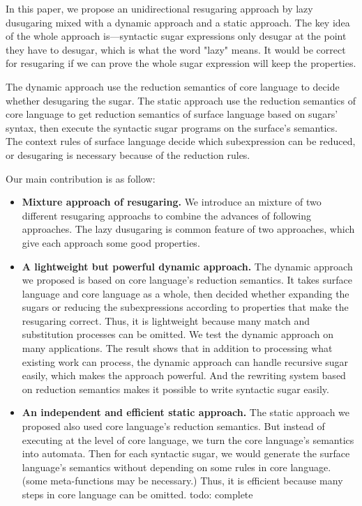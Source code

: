 In this paper, we propose an unidirectional resugaring approach by lazy dusugaring mixed with a dynamic approach and a static approach. The key idea of the whole approach is---syntactic sugar expressions only desugar at the point they have to desugar, which is what the word "lazy" means. It would be correct for resugaring if we can prove the whole sugar expression will keep the properties.

The dynamic approach use the reduction semantics of core language to decide whether desugaring the sugar. The static approach use the reduction semantics of core language to get reduction semantics of surface language based on sugars' syntax, then execute the syntactic sugar programs on the surface's semantics. The context rules of surface language decide which subexpression can be reduced, or desugaring is necessary because of the reduction rules.

Our main contribution is as follow:
\begin{itemize}
\item {\bfseries Mixture approach of resugaring.} We introduce an mixture of two different resugaring approachs to combine the advances of following approaches. The lazy dusugaring is common feature of two approaches, which give each approach some good properties.
\item {\bfseries A lightweight but powerful dynamic approach.} The dynamic approach we proposed is based on core language's reduction semantics. It takes surface language and core language as a whole, then decided whether expanding the sugars or reducing the subexpressions according to properties that make the resugaring correct. Thus, it is lightweight because many match and substitution processes can be omitted. We test the dynamic approach on many applications. The result shows that in addition to processing what existing work can process, the dynamic approach can handle recursive sugar easily, which makes the approach powerful. And the rewriting system based on reduction semantics makes it possible to write syntactic sugar easily.
\item {\bfseries An independent and efficient static approach.} The static approach we proposed also used core language's reduction semantics. But instead of executing at the level of core language, we turn the core language's semantics into automata. Then for each syntactic sugar, we would generate the surface language's semantics without depending on some rules in core language. (some meta-functions may be necessary.) Thus, it is efficient because many steps in core language can be omitted. todo: complete
\end{itemize}


